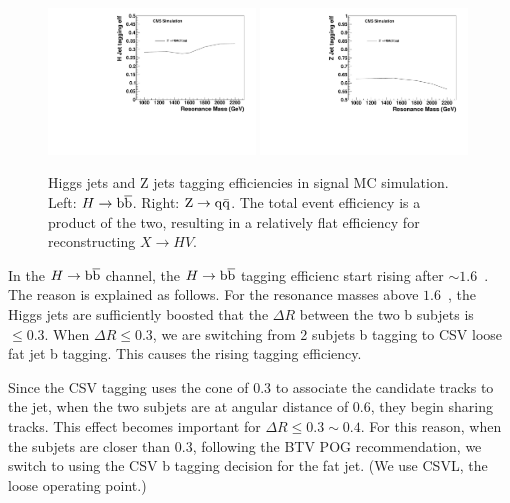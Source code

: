 \begin{figure}[htb]
\begin{center}
\includegraphics[width=0.49\textwidth]{EXO-14-009/HbbZqqfigs/Signal/H-taggingEff-8TeV.pdf}
\includegraphics[width=0.49\textwidth]{EXO-14-009/HbbZqqfigs/Signal/Z-taggingEff-8TeV.pdf}
\end{center}
\caption{
  Higgs jets and Z jets tagging efficiencies in signal MC simulation.
  Left: $H\to\mathrm{b\overline{b}}$. Right: ${\rm Z}\to{\rm q\bar{q}}$.  The total event efficiency is a product
  of the two, resulting in a relatively flat efficiency for reconstructing
  $X \to HV$.
}
\label{fig:HEff}
\end{figure}


In the $H\to\mathrm{b\overline{b}}$ channel, the $H\to\mathrm{b\overline{b}}$ tagging efficienc start rising 
after $\sim 1.6$~\TeVcc. The reason is explained as follows.  
For the resonance masses above $1.6$~\TeVcc, the Higgs
jets are sufficiently boosted that the $\Delta R$ between the two b
subjets is $\le 0.3$. When $\Delta R \leq 0.3$, we are switching from 2 subjets
b tagging to CSV loose fat jet b tagging.  This causes the rising tagging efficiency. 

Since the CSV tagging uses the cone of $0.3$ to
associate the candidate tracks to the jet, when the two subjets are at
angular distance of $0.6$, they begin sharing tracks. 
This effect becomes important for $\Delta R \le 0.3\sim0.4$.  For this
reason, when the subjets are closer than $0.3$, following the BTV POG
recommendation, we switch to using the CSV b tagging decision for the
fat jet. (We use CSVL, the loose operating point.)

